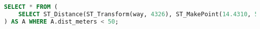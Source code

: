 \documentclass[border={15pt 1pt 5pt 1pt}, varwidth=38em]{standalone}
\begin{document}

\begin{lstlisting}[language=SQL, morekeywords={}]
SELECT * FROM (
	SELECT ST_Distance(ST_Transform(way, 4326), ST_MakePoint(14.4310, 50.0631)::geography) AS dist_meters, "shop", "bridge", "amenity", "bicycle", "office", "surface", "cutting", "wetland", "waterway", ... FROM planet_osm_line
) AS A WHERE A.dist_meters < 50;
\end{lstlisting}
\end{document}
